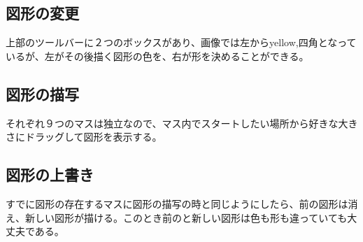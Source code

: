 \documentclass[12pt, a4paper, titlepage]{jsarticle}
\begin{document}
\subsection{図形の変更}
上部のツールバーに２つのボックスがあり、画像では左からyellow,四角となっているが、左がその後描く図形の色を、右が形を決めることができる。
\subsection{図形の描写}
それぞれ９つのマスは独立なので、マス内でスタートしたい場所から好きな大きさにドラッグして図形を表示する。
\subsection{図形の上書き}
すでに図形の存在するマスに図形の描写の時と同じようにしたら、前の図形は消え、新しい図形が描ける。このとき前のと新しい図形は色も形も違っていても大丈夫である。
\end{document}
